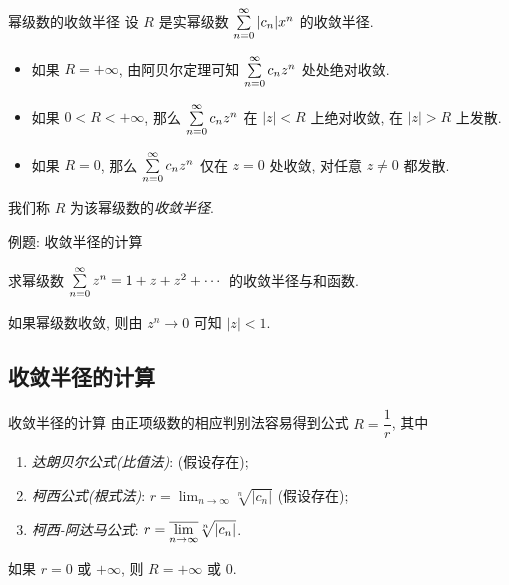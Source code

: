 \begin{frame}{幂级数的收敛半径}
	\onslide<+->
	设 $R$ 是实幂级数 $\sum\limits_{n=0}^\infty|c_n|x^n$ 的收敛半径.
	\begin{itemize}
		\item 如果 $R=+\infty$, 由阿贝尔定理可知 $\sum\limits_{n=0}^\infty c_nz^n$ 处处绝对收敛.
		\item 如果 $0<R<+\infty$, 那么 $\sum\limits_{n=0}^\infty c_nz^n$ 在 $|z|<R$ 上绝对收敛, 在 $|z|>R$ 上发散.
		\item 如果 $R=0$, 那么 $\sum\limits_{n=0}^\infty c_nz^n$ 仅在 $z=0$ 处收敛, 对任意 $z\neq 0$ 都发散.
	\end{itemize}
	\onslide<+->
	我们称 $R$ 为该幂级数的\emph{收敛半径}.

	\onslide<+->
	\begin{center}
	\end{center}
\end{frame}


\begin{frame}{例题: 收敛半径的计算}
	\onslide<+->
	\begin{example}
		求幂级数 $\sum\limits_{n=0}^\infty z^n=1+z+z^2+\cdots$ 的收敛半径与和函数.
	\end{example}

	\onslide<+->
	\begin{solution}
		如果幂级数收敛, 则由 $z^n\to0$ 可知 $|z|<1$.
		\onslide<+->{因此收敛半径为 $1$.}
	\end{solution}
\end{frame}


\subsection{收敛半径的计算}
\begin{frame}{收敛半径的计算}
	\onslide<+->
	由正项级数的相应判别法容易得到公式 $R=\dfrac1r$, 其中
	\begin{enumerate}
		\item \emph{达朗贝尔公式(比值法)}:  (假设存在);
		\item \emph{柯西公式(根式法)}: $r=\displaystyle\lim_{n\to\infty}\sqrt[n]{|c_n|}$ (假设存在);
		\item \emph{柯西-阿达马公式}: $r=\displaystyle\overline{\lim_{n\to\infty}} \sqrt[n]{|c_n|}$.
	\end{enumerate}
	\onslide<+->
	如果 $r=0$ 或 $+\infty$, 则 $R=+\infty$ 或 $0$.
\end{frame}


